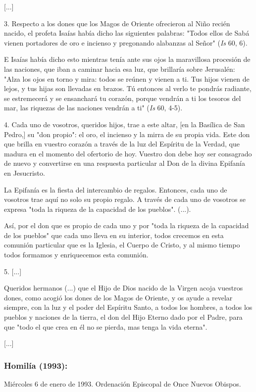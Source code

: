 \begin{body}
{[}...{]}

3. Respecto a los dones que los Magos de Oriente ofrecieron al Niño recién nacido, el profeta Isaías había dicho las siguientes palabras: "Todos ellos de Sabá vienen portadores de oro e incienso y pregonando alabanzas al Señor" (\emph{Is} 60, 6).

E Isaías había dicho esto mientras tenía ante sus ojos la maravillosa procesión de las naciones, que iban a caminar hacia esa luz, que brillaría sobre Jerusalén: "Alza los ojos en torno y mira: todos se reúnen y vienen a ti. Tus hijos vienen de lejos, y tus hijas son llevadas en brazos. Tú entonces al verlo te pondrás radiante, se estremecerá y se ensanchará tu corazón, porque vendrán a ti los tesoros del mar, las riquezas de las naciones vendrán a ti" (\emph{Is} 60, 4-5).

4. Cada uno de vosotros, queridos hijos, trae a este altar, {[}en la Basílica de San Pedro,{]} su "don propio": el oro, el incienso y la mirra de su propia vida. Este don que brilla en vuestro corazón a través de la luz del Espíritu de la Verdad, que madura en el momento del ofertorio de hoy. Vuestro don debe hoy ser consagrado de nuevo y convertirse en una respuesta particular al Don de la divina Epifanía en Jesucristo.

La Epifanía es la fiesta del intercambio de regalos. Entonces, cada uno de vosotros trae aquí no solo su propio regalo. A través de cada uno de vosotros se expresa "toda la riqueza de la capacidad de los pueblos". (...).

Así, por el don que es propio de cada uno y por "toda la riqueza de la capacidad de los pueblos" que cada uno lleva en su interior, todos crecemos en esta comunión particular que es la Iglesia, el Cuerpo de Cristo, y al mismo tiempo todos formamos y enriquecemos esta comunión.

5. {[}...{]}

Queridos hermanos (...) que el Hijo de Dios nacido de la Virgen acoja vuestros dones, como acogió los dones de los Magos de Oriente, y os ayude a revelar siempre, con la luz y el poder del Espíritu Santo, a todos los hombres, a todos los pueblos y naciones de la tierra, el don del Hijo Eterno dado por el Padre, para que "todo el que crea en él no se pierda, mas tenga la vida eterna".

{[}...{]}

\subsubsection{Homilía (1993): } Miércoles 6 de enero de 1993. Ordenación Episcopal de Once Nuevos Obispos.


\end{body}
